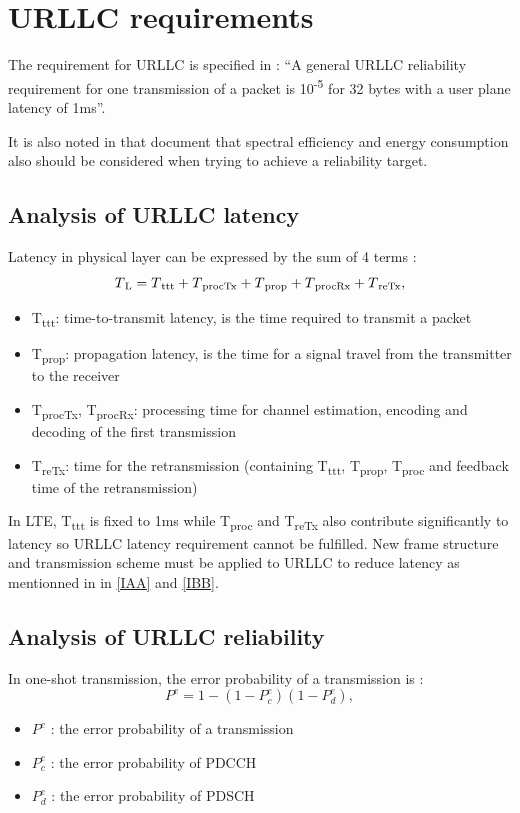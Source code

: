 \documentclass[conference]{IEEEtran}
\begin{document}
\section{URLLC requirements}
The requirement for URLLC is specified in \cite{b6}: ``A general URLLC reliability requirement for one transmission of a packet is 10\textsuperscript{-5} for 32 bytes with a user plane latency of 1ms''.

It is also noted in that document that spectral efficiency and energy consumption also should be considered when trying to achieve a reliability target. 
\subsection{Analysis of URLLC latency}
Latency in physical layer can be expressed by the sum of 4 terms \cite{ad1}:
\begin{equation}
T\textsubscript{L}= T\textsubscript{ttt} + T\textsubscript{procTx} + T\textsubscript{prop} + T\textsubscript{procRx} + T\textsubscript{reTx},\label{eq1}
\end{equation}
\begin{itemize}
\item T\textsubscript{ttt}: time-to-transmit latency, is the time required to transmit a packet
\item T\textsubscript{prop}: propagation latency, is the time for a signal travel from the transmitter to the receiver
\item T\textsubscript{procTx}, T\textsubscript{procRx}: processing time for channel estimation, encoding and decoding of the first transmission
\item T\textsubscript{reTx}: time for the retransmission (containing T\textsubscript{ttt}, T\textsubscript{prop}, T\textsubscript{proc} and feedback time of the retransmission) 
\end{itemize}

In LTE, T\textsubscript{ttt} is fixed to 1ms while T\textsubscript{proc} and T\textsubscript{reTx} also contribute significantly to latency so URLLC latency requirement cannot be fulfilled. New frame structure and transmission scheme must be applied to URLLC to reduce latency as mentionned in in \ref{IAA} and \ref{IBB}.  
\subsection{Analysis of URLLC reliability}\label{IIBB}
In one-shot transmission, the error probability of a transmission is :
\begin{equation}
P^{e} = 1 - (1 - P^{e}_{c})(1 - P^{e}_{d})\label{eq2},
\end{equation}
\begin{itemize}
    \item $P^{e}$ : the error probability of a transmission
    \item $P^{e}_{c}$ : the error probability of PDCCH 
    \item $P^{e}_{d}$ : the error probability of PDSCH
\end{itemize}
\end{document}
